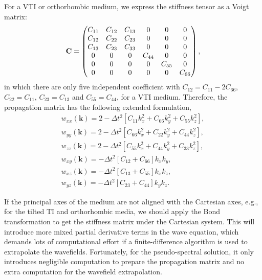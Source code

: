 For a VTI or orthorhombic medium, we express the stiffness tensor as a Voigt matrix: 
\begin{equation}
\mathbf{C} = 
\begin{pmatrix}C_{11} &C_{12} &C_{13} &0 &0 &0 \cr
         C_{12} &C_{22} &C_{23} &0 &0 &0 \cr
         C_{13} &C_{23} &C_{33} &0 &0 &0 \cr 
         0& 0&  0 & C_{44} &0 &0 \cr
         0& 0&  0 &0 & C_{55} &0 \cr
         0& 0&  0 &0 &0 &C_{66}\end{pmatrix},
\end{equation}
in which there are only five independent coefficient with
$C_{12}=C_{11}-2C_{66}$, $C_{22}=C_{11}$, $C_{23}=C_{13}$ and $C_{55}=C_{44}$, for a VTI medium.
Therefore, the propagation matrix has the following extended formulation,
\begin{equation}
\label{eq:ww}
\begin{array}{lcl} 
w_{xx}(\mathbf{k})=2-\Delta{t}^2[C_{11}k^2_x+C_{66}k^2_y+C_{55}k^2_z], \\
w_{yy}(\mathbf{k})=2-\Delta{t}^2[C_{66}k^2_x+C_{22}k^2_y+C_{44}k^2_z], \\
w_{zz}(\mathbf{k})=2-\Delta{t}^2[C_{55}k^2_x+C_{44}k^2_y+C_{33}k^2_z], \\
w_{xy}(\mathbf{k})=-\Delta{t}^2[C_{12}+C_{66}]{k_x}{k_y}, \\
w_{xz}(\mathbf{k})=-\Delta{t}^2[C_{13}+C_{55}]{k_x}{k_z}, \\
w_{yz}(\mathbf{k})=-\Delta{t}^2[C_{23}+C_{44}]{k_y}{k_z}.
\end{array}
\end{equation}

If the principal axes of the medium are not aligned with the Cartesian axes, e.g., for the tilted TI and orthorhombic media,
we should apply the Bond transformation \cite[]{winterstein,carcione:2007} to get the stiffness matrix
under the Cartesian system.
This will introduce more mixed partial derivative terms in the wave equation, which demands lots of computational effort
if a finite-difference algorithm is used to extrapolate the wavefields.
Fortunately, for the pseudo-spectral solution, it only introduces negligible computation to prepare the propagation matrix
and no extra computation for the wavefield extrapolation.

